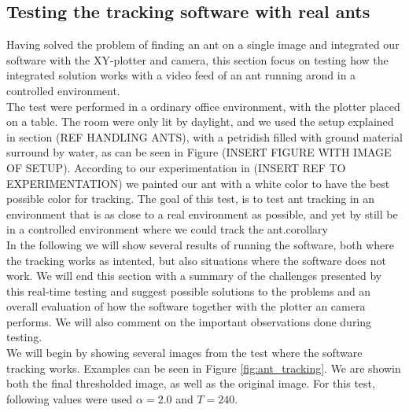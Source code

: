 
% 
% 


\subsection{Testing the tracking software with real ants}

Having solved the problem of finding an ant on a single image and integrated our software with the XY-plotter and camera, this section focus on testing how the integrated solution works with a video feed of an ant running arond in a controlled environment.\\

The test were performed in a ordinary office environment, with the plotter placed on a table. The room were only lit by daylight, and we used the setup explained in section (REF HANDLING ANTS), with a petridish filled with ground material surround by water, as can be seen in Figure (INSERT FIGURE WITH IMAGE OF SETUP). According to our experimentation in (INSERT REF TO EXPERIMENTATION) we painted our ant with a white color to have the best possible color for tracking. The goal of this test, is to test ant tracking in an environment that is as close to a real environment as possible, and yet by still be in a controlled environment where we could track the ant.corollary\\


In the following we will show several results of running the software, both where the tracking works as intented, but also situations where the software does not work. We will end this section with a summary of the challenges presented by this real-time testing and suggest possible solutions to the problems and an overall evaluation of how the software together with the plotter an camera performs. We will also comment on the important observations done during testing.\\

We will begin by showing several images from the test where the software tracking works. Examples can be seen in Figure \ref{fig:ant_tracking}. We are showin both the final thresholded image, as well as the original image. For this test, following values were used $\alpha = 2.0$ and $T = 240$.\\

